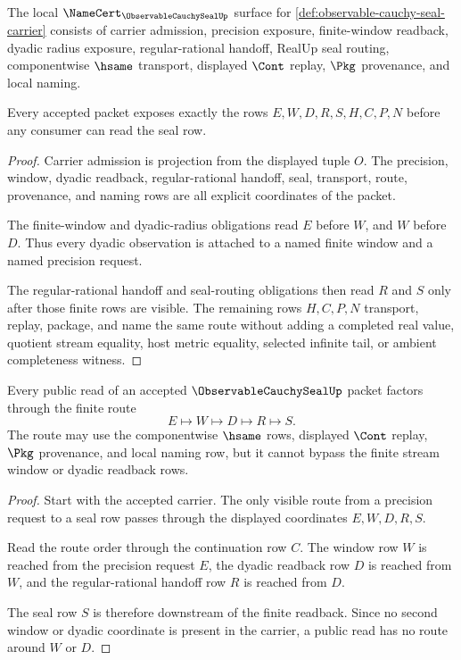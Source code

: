 \begin{theorem}
\label{thm:observable-cauchy-seal-namecert-obligations}
The local $\NameCert_{\ObservableCauchySealUp}$ surface for \autoref{def:observable-cauchy-seal-carrier} consists of carrier admission, precision exposure, finite-window readback, dyadic radius exposure, regular-rational handoff, RealUp seal routing, componentwise $\hsame$ transport, displayed $\Cont$ replay, $\Pkg$ provenance, and local naming.

Every accepted packet exposes exactly the rows $E,W,D,R,S,H,C,P,N$ before any consumer can read the seal row.
\end{theorem}
\begin{proof}
Carrier admission is projection from the displayed tuple $O$. The precision, window, dyadic readback, regular-rational handoff, seal, transport, route, provenance, and naming rows are all explicit coordinates of the packet.

The finite-window and dyadic-radius obligations read $E$ before $W$, and $W$ before $D$. Thus every dyadic observation is attached to a named finite window and a named precision request.

The regular-rational handoff and seal-routing obligations then read $R$ and $S$ only after those finite rows are visible. The remaining rows $H,C,P,N$ transport, replay, package, and name the same route without adding a completed real value, quotient stream equality, host metric equality, selected infinite tail, or ambient completeness witness.
\end{proof}

\begin{theorem}
\label{thm:observable-cauchy-seal-window-factorization}
Every public read of an accepted $\ObservableCauchySealUp$ packet factors through the finite route
$$
E \longmapsto W \longmapsto D \longmapsto R \longmapsto S.
$$
The route may use the componentwise $\hsame$ rows, displayed $\Cont$ replay, $\Pkg$ provenance, and local naming row, but it cannot bypass the finite stream window or dyadic readback rows.
\end{theorem}
\begin{proof}
Start with the accepted carrier. The only visible route from a precision request to a seal row passes through the displayed coordinates $E,W,D,R,S$.

Read the route order through the continuation row $C$. The window row $W$ is reached from the precision request $E$, the dyadic readback row $D$ is reached from $W$, and the regular-rational handoff row $R$ is reached from $D$.

The seal row $S$ is therefore downstream of the finite readback. Since no second window or dyadic coordinate is present in the carrier, a public read has no route around $W$ or $D$.
\end{proof}

